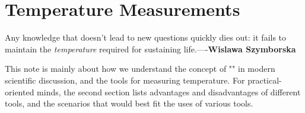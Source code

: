 \chapter{Temperature Measurements}
\begin{docspec}
	Any knowledge that doesn't lead to new questions quickly dies out: it fails to maintain the \textit{temperature} required for sustaining life.----\textbf{Wislawa Szymborska}
\end{docspec}

This note is mainly about how we understand the concept of "" in modern scientific discussion, and the tools for measuring temperature. For practical-oriented minds, the second section lists advantages and disadvantages of different tools, and the scenarios that would best fit the uses of various tools. 

